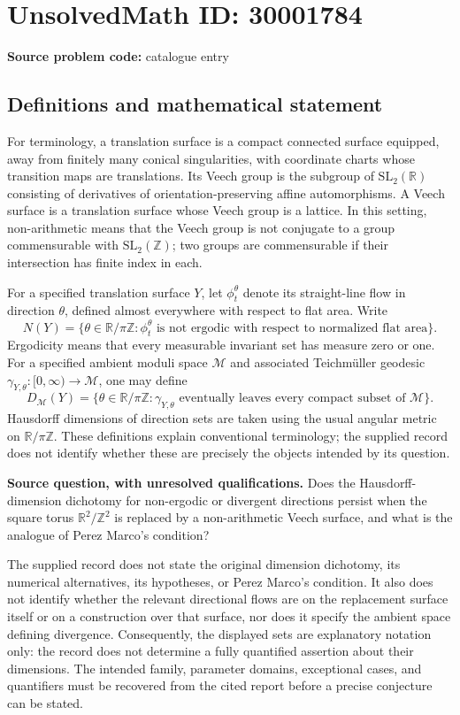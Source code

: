 \documentclass[11pt]{article}
\newcommand{\Z}{\mathbb{Z}}
\newcommand{\R}{\mathbb{R}}
\begin{document}
\section*{UnsolvedMath ID: 30001784}
\textbf{Source problem code:} catalogue entry
\subsection{Definitions and mathematical statement}
For terminology, a translation surface is a compact connected surface equipped, away from finitely many conical singularities, with coordinate charts whose transition maps are translations. Its Veech group is the subgroup of \(\mathrm{SL}_2(\R)\) consisting of derivatives of orientation-preserving affine automorphisms. A Veech surface is a translation surface whose Veech group is a lattice. In this setting, non-arithmetic means that the Veech group is not conjugate to a group commensurable with \(\mathrm{SL}_2(\Z)\); two groups are commensurable if their intersection has finite index in each.

For a specified translation surface \(Y\), let \(\phi_t^\theta\) denote its straight-line flow in direction \(\theta\), defined almost everywhere with respect to flat area. Write
\[
N(Y)=\{\theta\in\R/\pi\Z:\phi_t^\theta\text{ is not ergodic with respect to normalized flat area}\}.
\]
Ergodicity means that every measurable invariant set has measure zero or one. For a specified ambient moduli space \(\mathcal M\) and associated Teichm\"uller geodesic \(\gamma_{Y,\theta}:[0,\infty)\to\mathcal M\), one may define
\[
D_{\mathcal M}(Y)=\{\theta\in\R/\pi\Z:\gamma_{Y,\theta}\text{ eventually leaves every compact subset of }\mathcal M\}.
\]
Hausdorff dimensions of direction sets are taken using the usual angular metric on \(\R/\pi\Z\). These definitions explain conventional terminology; the supplied record does not identify whether these are precisely the objects intended by its question.

\textbf{Source question, with unresolved qualifications.} Does the Hausdorff-dimension dichotomy for non-ergodic or divergent directions persist when the square torus \(\R^2/\Z^2\) is replaced by a non-arithmetic Veech surface, and what is the analogue of Perez Marco's condition?

The supplied record does not state the original dimension dichotomy, its numerical alternatives, its hypotheses, or Perez Marco's condition. It also does not identify whether the relevant directional flows are on the replacement surface itself or on a construction over that surface, nor does it specify the ambient space defining divergence. Consequently, the displayed sets are explanatory notation only: the record does not determine a fully quantified assertion about their dimensions. The intended family, parameter domains, exceptional cases, and quantifiers must be recovered from the cited report before a precise conjecture can be stated.
\end{document}
